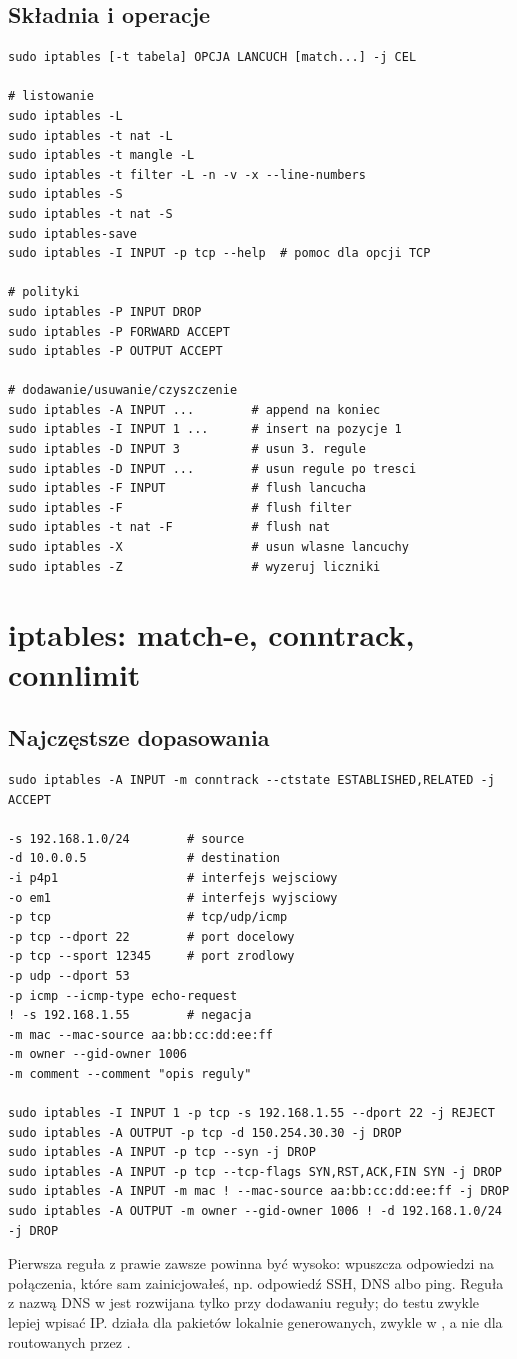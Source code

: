 \documentclass[10pt,a5paper,twoside]{article}
\newcommand{\code}[1]{\texttt{\detokenize{#1}}}
\begin{document}
\subsection{Składnia i operacje}
\begin{lstlisting}
sudo iptables [-t tabela] OPCJA LANCUCH [match...] -j CEL

# listowanie
sudo iptables -L
sudo iptables -t nat -L
sudo iptables -t mangle -L
sudo iptables -t filter -L -n -v -x --line-numbers
sudo iptables -S
sudo iptables -t nat -S
sudo iptables-save
sudo iptables -I INPUT -p tcp --help  # pomoc dla opcji TCP

# polityki
sudo iptables -P INPUT DROP
sudo iptables -P FORWARD ACCEPT
sudo iptables -P OUTPUT ACCEPT

# dodawanie/usuwanie/czyszczenie
sudo iptables -A INPUT ...        # append na koniec
sudo iptables -I INPUT 1 ...      # insert na pozycje 1
sudo iptables -D INPUT 3          # usun 3. regule
sudo iptables -D INPUT ...        # usun regule po tresci
sudo iptables -F INPUT            # flush lancucha
sudo iptables -F                  # flush filter
sudo iptables -t nat -F           # flush nat
sudo iptables -X                  # usun wlasne lancuchy
sudo iptables -Z                  # wyzeruj liczniki
\end{lstlisting}

\section{iptables: match-e, conntrack, connlimit}
\subsection{Najczęstsze dopasowania}
\begin{lstlisting}
sudo iptables -A INPUT -m conntrack --ctstate ESTABLISHED,RELATED -j ACCEPT

-s 192.168.1.0/24        # source
-d 10.0.0.5              # destination
-i p4p1                  # interfejs wejsciowy
-o em1                   # interfejs wyjsciowy
-p tcp                   # tcp/udp/icmp
-p tcp --dport 22        # port docelowy
-p tcp --sport 12345     # port zrodlowy
-p udp --dport 53
-p icmp --icmp-type echo-request
! -s 192.168.1.55        # negacja
-m mac --mac-source aa:bb:cc:dd:ee:ff
-m owner --gid-owner 1006
-m comment --comment "opis reguly"

sudo iptables -I INPUT 1 -p tcp -s 192.168.1.55 --dport 22 -j REJECT
sudo iptables -A OUTPUT -p tcp -d 150.254.30.30 -j DROP
sudo iptables -A INPUT -p tcp --syn -j DROP
sudo iptables -A INPUT -p tcp --tcp-flags SYN,RST,ACK,FIN SYN -j DROP
sudo iptables -A INPUT -m mac ! --mac-source aa:bb:cc:dd:ee:ff -j DROP
sudo iptables -A OUTPUT -m owner --gid-owner 1006 ! -d 192.168.1.0/24 -j DROP
\end{lstlisting}
Pierwsza reguła z \code{conntrack} prawie zawsze powinna być wysoko: wpuszcza odpowiedzi na połączenia, które sam zainicjowałeś, np. odpowiedź SSH, DNS albo ping. Reguła z nazwą DNS w \code{-d} jest rozwijana tylko przy dodawaniu reguły; do testu zwykle lepiej wpisać IP. \code{owner} działa dla pakietów lokalnie generowanych, zwykle w \code{OUTPUT}, a nie dla routowanych przez \code{FORWARD}.
\end{document}
